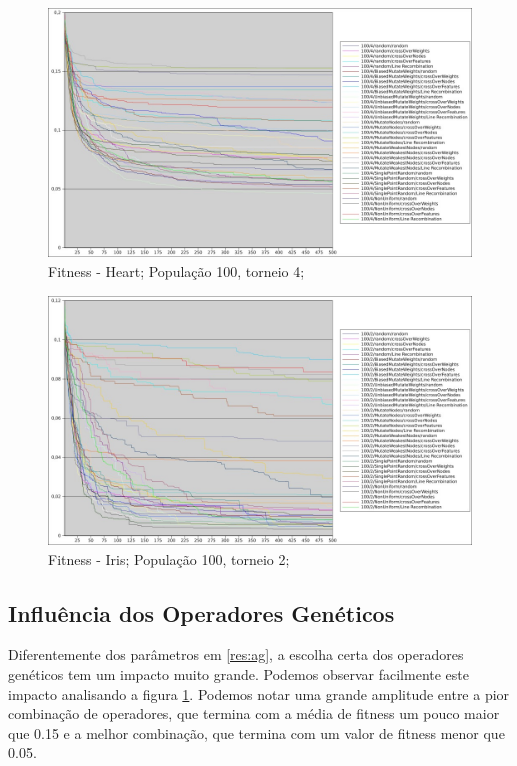 \documentclass[12pt]{article}
\begin{document}
\begin{figure}[htp]
\center
\includegraphics[scale=0.33, keepaspectratio]{hea_100_4.jpg} 
\caption{Fitness - Heart; População 100, torneio 4;}
\label{fig:hea100.4}
\end{figure}

\begin{figure}[hbp]
\center
\includegraphics[scale=0.33, keepaspectratio]{iri_100_2.jpg} 
\caption{Fitness - Iris; População 100, torneio 2;}
\label{fig:iri100.2}
\end{figure}

\subsection{Influência dos Operadores Genéticos}

Diferentemente dos parâmetros em \ref{res:ag}, a escolha certa dos operadores genéticos tem um impacto muito grande. Podemos observar facilmente este impacto analisando a figura \ref{fig:hea100.4}. Podemos notar uma grande amplitude entre a pior combinação de operadores, que termina com a média de fitness um pouco maior que 0.15 e a melhor combinação, que termina com um valor de fitness menor que 0.05.
\end{document}
